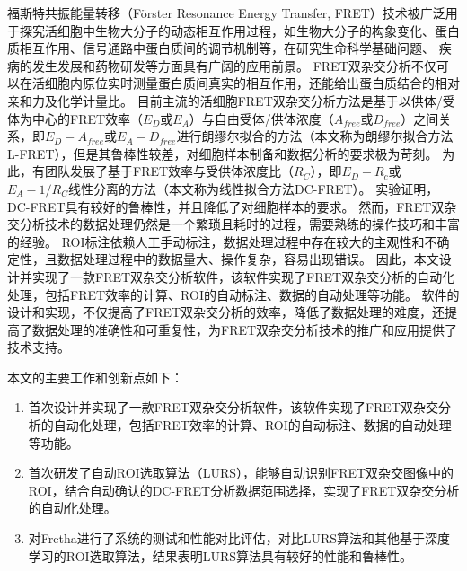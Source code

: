 \begin{cabstract}

\ifshowtext
福斯特共振能量转移（Förster Resonance Energy Transfer, FRET）技术被广泛用于探究活细胞中生物大分子的动态相互作用过程，如生物大分子的构象变化、蛋白质相互作用、信号通路中蛋白质间的调节机制等，在研究生命科学基础问题、 疾病的发生发展和药物研发等方面具有广阔的应用前景。
FRET双杂交分析不仅可以在活细胞内原位实时测量蛋白质间真实的相互作用，还能给出蛋白质结合的相对亲和力及化学计量比。
目前主流的活细胞FRET双杂交分析方法是基于以供体/受体为中心的FRET效率（$E_D$或$E_A$）与自由受体/供体浓度（$A_{free}$或$D_{free}$）之间关系，即${E_D-A_{free}}$或${E_A-D_{free}}$进行朗缪尔拟合的方法（本文称为朗缪尔拟合方法L-FRET），但是其鲁棒性较差，对细胞样本制备和数据分析的要求极为苛刻。
为此，有团队发展了基于FRET效率与受供体浓度比（$R_C$），即$E_D-R_c$或$E_A-1/R_C$线性分离的方法（本文称为线性拟合方法DC-FRET）。
实验证明，DC-FRET具有较好的鲁棒性，并且降低了对细胞样本的要求。
然而，FRET双杂交分析技术的数据处理仍然是一个繁琐且耗时的过程，需要熟练的操作技巧和丰富的经验。
ROI标注依赖人工手动标注，数据处理过程中存在较大的主观性和不确定性，且数据处理过程中的数据量大、操作复杂，容易出现错误。
因此，本文设计并实现了一款FRET双杂交分析软件，该软件实现了FRET双杂交分析的自动化处理，包括FRET效率的计算、ROI的自动标注、数据的自动处理等功能。
软件的设计和实现，不仅提高了FRET双杂交分析的效率，降低了数据处理的难度，还提高了数据处理的准确性和可重复性，为FRET双杂交分析技术的推广和应用提供了技术支持。

本文的主要工作和创新点如下：
\begin{enumerate}
  \item 首次设计并实现了一款FRET双杂交分析软件，该软件实现了FRET双杂交分析的自动化处理，包括FRET效率的计算、ROI的自动标注、数据的自动处理等功能。
  \item 首次研发了自动ROI选取算法（LURS），能够自动识别FRET双杂交图像中的ROI，结合自动确认的DC-FRET分析数据范围选择，实现了FRET双杂交分析的自动化处理。
  \item 对Fretha进行了系统的测试和性能对比评估，对比LURS算法和其他基于深度学习的ROI选取算法，结果表明LURS算法具有较好的性能和鲁棒性。
\end{enumerate}
\fi
\end{cabstract}


